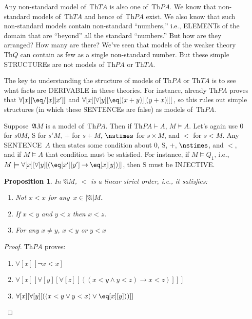 \documentclass[10pt,a4paper]{article}
\newcommand*{\olup}[1]{\MakeUppercase{#1}}
\theoremstyle{plain}
\newtheorem{prop}[thm]{Proposition}
\theoremstyle{definition}
\theoremstyle{remark}
\newenvironment{explain}{}{}
\providecommand{\lif}{\mathbin{\rightarrow}}
\providecommand{\lforall}{\mathord{\forall}}
\providecommand{\Proves}{\mathrel{\vdash}}
\providecommand{\Obj}{}
\providecommand{\Struct}{\ensuremath{\mathfrak{A}}}
\providecommand{\Domain}{\ensuremath{|\mathfrak{A}|}}
\providecommand{\Assign}{\ensuremath{s}}
\providecommand{\Sat}[2]{\ensuremath{#1 \models #2}}
\providecommand{\Th}{\ensuremath{\mathrm{Th}}}
\providecommand{\nszero}{\mathrm{0}}
\providecommand{\nssucc}{\mathrm{S}}
\providecommand{\nsplus}{\mathbin{+}}
\providecommand{\nsless}{<}
\begin{document}
\begin{explain}
Any non-standard model of~$\Th{TA}$ is also one of~$\Th{PA}$. We know
that non-standard models of~$\Th{TA}$ and hence of~$\Th{PA}$ exist. We
also know that such non-standard models contain non-standard
``numbers,'' i.e., \olup{element}s of the domain that are ``beyond'' all
the standard ``numbers.''  But how are they arranged? How many are
there? We've seen that models of the weaker theory~$\Th{Q}$ can
contain as few as a single non-standard number. But these simple
\olup{structure}s are not models of $\Th{PA}$ or $\Th{TA}$.

The key to understanding the structure of models of $\Th{PA}$ or
$\Th{TA}$ is to see what facts are \olup{derivable} in these theories.
For instance, already $\Th{PA}$ proves that $\lforall[x][\eq/[x][x']]$
and $\lforall[x][\lforall[y][\eq[(x+y)][(y+x)]]]$, so this rules out
simple structures (in which these \olup{sentence}s are false) as models
of~$\Th{PA}$.

Suppose~$\Struct{M}$ is a model of~$\Th{PA}$. Then if $\Th{PA} \Proves
A$, $\Sat{M}{A}$.  Let's again use $\nszero$ for
$\Assign{\Obj{0}}{M}$, $\nssucc$ for $\Assign{\prime}{M}$, $\nsplus$
for $\Assign{+}{M}$, $\nstimes$ for $\Assign{\times}{M}$, and
$\nsless$ for $\Assign{<}{M}$. Any \olup{sentence}~$A$ then states some
condition about $\nszero$, $\nssucc$, $\nsplus$, $\nstimes$, and
$\nsless$, and if $\Sat{M}{A}$ that condition must be satisfied. For
instance, if $\Sat{M}{Q_1}$, i.e.,
$\Sat{M}{\lforall[x][\lforall[y][(\eq[x'][y'] \lif \eq[x][y])]]}$,
then $\nssucc$ must be \olup{injective}.
\end{explain}

\begin{prop}
In $\Struct{M}$, $\nsless$ is a linear strict order, i.e., it
satisfies:
\begin{enumerate}
\item Not $x \nsless x$ for any~$x \in \Domain{M}$.
\item If $x \nsless y$ and $y \nsless z$ then $x \nsless z$.
\item For any $x \neq y$, $x \nsless y$ or $y \nsless x$
\end{enumerate}
\end{prop}

\begin{proof}
$\Th{PA}$ proves:
\begin{enumerate}
\item $\lforall[x][\lnot x < x]$
\item $\lforall[x][\lforall[y][\lforall[z][((x < y \land y < z) \lif x < z)]]]$
\item $\lforall[x][\lforall[y][((x < y \lor y < x) \lor \eq[x][y]))]]$
\end{enumerate}
\end{proof}
\end{document}
